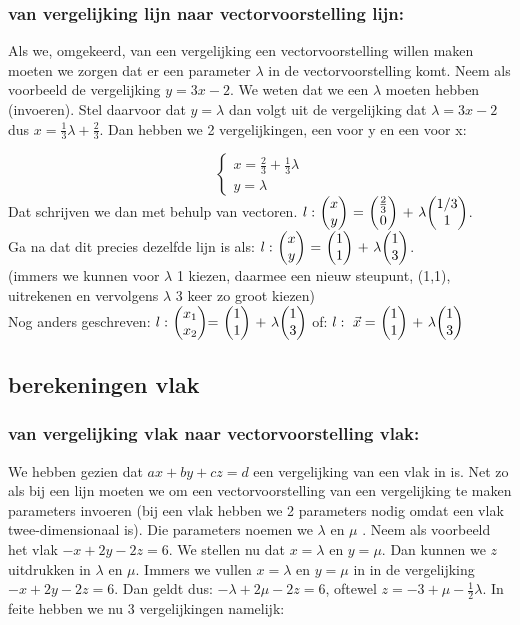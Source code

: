 \documentclass[hidelinks, a4wide, 12pt,  twoside]{book}
\begin{document}

\subsubsection{van vergelijking lijn naar vectorvoorstelling lijn:}
Als we, omgekeerd, van een vergelijking een vectorvoorstelling willen maken moeten we zorgen dat er een parameter $ \lambda $ in de vectorvoorstelling komt. Neem als voorbeeld de vergelijking $ y = 3x - 2 $. We weten dat we een $ \lambda $ moeten hebben (invoeren). Stel daarvoor dat $ y =  \lambda $ dan volgt uit de vergelijking  dat $ \lambda = 3x -2 $ dus $ x = \frac{1}{3}  \lambda  + \frac{2}{3} $. Dan hebben we  2 vergelijkingen, een voor y en een voor x:

\[\begin{cases}
x = \frac{2}{3} + \frac{1}{3} \lambda\\
y =  \lambda 
\end{cases}
\] 
Dat schrijven we dan met behulp van vectoren. 
$ l: \  \vectwee {x}{y} \ = \ \vectwee {\frac{2}{3}}{0} \ +\  \lambda  \vectwee {1/3}{1}  $.\\
Ga na dat dit precies dezelfde lijn is als:
$ l: \  \vectwee {x}{y} \ = \ \vectwee {1}{1} \ +\  \lambda  \vectwee {1}{3}  $.\\ (immers we kunnen voor $ \lambda $ 1 kiezen, daarmee een nieuw steupunt, (1,1), uitrekenen en vervolgens $ \lambda $ 3 keer zo groot kiezen)\\
Nog anders geschreven:
$  l: \  \vectweesnel{x} =  \ \vectwee {1}{1} \ +\  \lambda  \vectwee {1}{3}  $ \qquad
of: $ l: \ \vec{x} = \ \vectwee{1}{1} \ + \ \lambda \vectwee {1}{3} $

\subsection{berekeningen vlak}
\subsubsection{van vergelijking vlak naar vectorvoorstelling vlak:}
We hebben gezien dat $ ax + by + cz = d $ een vergelijking van een vlak in \RD is. Net zo als bij een lijn moeten we om een vectorvoorstelling van een vergelijking te maken parameters invoeren (bij een vlak hebben we 2 parameters nodig omdat een vlak  twee-dimensionaal is). Die parameters noemen we $ \lambda $  en $ \mu $ . Neem als voorbeeld het vlak $ -x + 2y -2z = 6 $.  We stellen  nu dat $ x=  \lambda $ en $ y = \mu $. Dan kunnen we $ z$ uitdrukken in $ \lambda $  en $ \mu $. Immers we vullen  $ x=  \lambda $ en $ y = \mu $ in in de vergelijking $ -x + 2y -2z = 6 $. Dan geldt dus: $ -\lambda + 2\mu -2z = 6 $, oftewel $ z = -3 + \mu -   \frac{1}{2} \lambda $. In feite hebben we nu 3 vergelijkingen namelijk:
\end{document}
